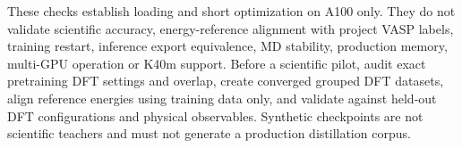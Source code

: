 \documentclass[10pt,a4paper]{article}
\begin{document}
These checks establish loading and short optimization on A100 only. They do not
validate scientific accuracy, energy-reference alignment with project VASP labels,
training restart, inference export equivalence, MD stability, production memory,
multi-GPU operation or K40m support. Before a scientific pilot, audit exact
pretraining DFT settings and overlap, create converged grouped DFT datasets,
align reference energies using training data only, and validate against held-out
DFT configurations and physical observables. Synthetic checkpoints are not
scientific teachers and must not generate a production distillation corpus.
\end{document}
